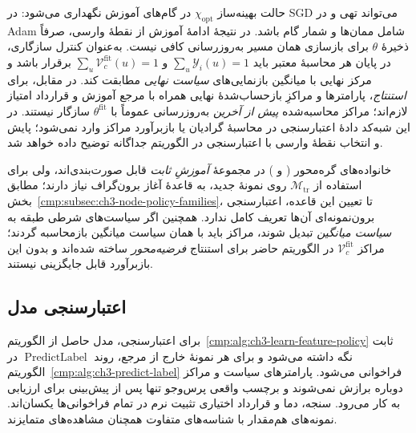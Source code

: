 حالت بهینه‌ساز $\chi_{\mathrm{opt}}$ در گام‌های آموزش
نگهداری می‌شود: در SGD می‌تواند تهی و
در Adam شامل ممان‌ها و شمار گام باشد.
در نتیجهٔ ادامهٔ آموزش از نقطهٔ وارسی،
صرفاً ذخیرهٔ $\theta$ برای بازسازی همان
مسیر به‌روزرسانی کافی نیست.
به‌عنوان کنترل سازگاری، در پایان هر محاسبهٔ
معتبر باید $\sum_u\mathscr Y_i(u)=1$
و $\sum_u\mathcal V_c^{\mathrm{fit}}(u)=1$
برقرار باشد و مرکز نهایی با میانگین
بازنمایی‌های \emph{سیاست نهایی} مطابقت کند.
در مقابل، برای \emph{استنتاج}، پارامترها و
مراکزِ بازحساب‌شدهٔ نهایی همراه با
مرجع آموزش و قرارداد امتیاز لازم‌اند؛
مراکز محاسبه‌شده \emph{پیش از آخرین}
به‌روزرسانی عموماً با $\theta^{\mathrm{fit}}$
سازگار نیستند. در این شبه‌کد دادهٔ
اعتبارسنجی در محاسبهٔ گرادیان یا
بازبرآورد مراکز وارد نمی‌شود؛
پایش و انتخاب نقطهٔ وارسی با اعتبارسنجی
در الگوریتم جداگانه توضیح داده خواهد شد.

خانواده‌های گره‌محور
( و )
در مجموعهٔ \emph{آموزشِ ثابت} قابل
صورت‌بندی‌اند، ولی برای استفاده از
$\mathcal M_{\mathrm{tr}}$ روی نمونهٔ جدید،
به قاعدهٔ آغاز برون‌گراف نیاز دارند؛
مطابق بخش~\ref{cmp:subsec:ch3-node-policy-families}،
تا تعیین این قاعده، اعتبارسنجی برون‌نمونه‌ای
آن‌ها تعریف کامل ندارد.
همچنین اگر سیاست‌های شرطی طبقه به
\emph{سیاست میانگین} تبدیل شوند،
مراکز باید با همان سیاست میانگین
بازمحاسبه گردند؛ مراکز
$\mathcal V_c^{\mathrm{fit}}$ در الگوریتم حاضر
برای استنتاج \emph{فرضیه‌محور} ساخته شده‌اند
و بدون این بازبرآورد قابل جایگزینی نیستند.

\subsection{اعتبارسنجی مدل}
\label{cmp:subsec:ch3-heldout-validation-algorithm}
برای اعتبارسنجی، مدل حاصل از
الگوریتم~\ref{cmp:alg:ch3-learn-feature-policy} ثابت
نگه داشته می‌شود و برای هر نمونهٔ خارج از مرجع،
روند $\operatorname{PredictLabel}$ در
الگوریتم~\ref{cmp:alg:ch3-predict-label} فراخوانی
می‌شود. پارامترهای سیاست و مراکز دوباره برازش
نمی‌شوند و برچسب واقعی پرس‌وجو تنها پس از پیش‌بینی
برای ارزیابی به کار می‌رود. سنجه، دما و قرارداد
اختیاری تثبیت نرم در تمام فراخوانی‌ها یکسان‌اند.
نمونه‌های هم‌مقدار با شناسه‌های متفاوت همچنان
مشاهده‌های متمایزند.

